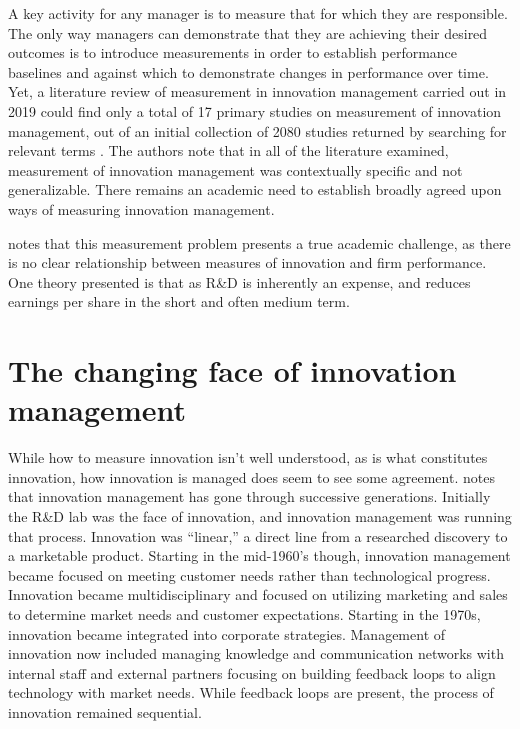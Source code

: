 \documentclass[man]{apa7}
\begin{document}
A key activity for any manager is to measure that for which they are responsible. The only way managers can demonstrate that they are achieving their desired outcomes is to introduce measurements in order to establish performance baselines and against which to demonstrate changes in performance over time. Yet, a literature review of measurement in innovation management carried out in 2019 could find only a total of 17 primary studies on measurement of innovation management, out of an initial collection of 2080 studies returned by searching for relevant terms \parencite{melendezLiteratureReviewMeasurement2019}.  The authors note that in all of the literature examined, measurement of innovation management was contextually specific and not generalizable. There remains an academic need to establish broadly agreed upon ways of measuring innovation management.

\textcite{tiddInnovationManagementContext2001} notes that this measurement problem presents a true academic challenge, as there is no clear relationship between measures of innovation and firm performance. One theory presented is that as R\&D is inherently an expense, and reduces earnings per share in the short and often medium term. 

\section{The changing face of innovation management}
\label{sec:org212b4fb}

While how to measure innovation isn't well understood, as is what constitutes innovation, how innovation is managed does seem to see some agreement. \textcite{orttEvolutionInnovationManagement2008} notes that innovation management has gone through successive generations. Initially the R\&D lab was the face of innovation, and innovation management was running that process. Innovation was ``linear,'' a direct line from a researched discovery to a marketable product. Starting in the mid-1960's though, innovation management became focused on meeting customer needs rather than technological progress. Innovation became multidisciplinary and focused on utilizing marketing and sales to determine market needs and customer expectations. Starting in the 1970s, innovation became integrated into corporate strategies. Management of innovation now included managing knowledge and communication networks with internal staff and external partners focusing on building feedback loops to align technology with market needs. While feedback loops are present, the process of innovation remained sequential.
\end{document}

